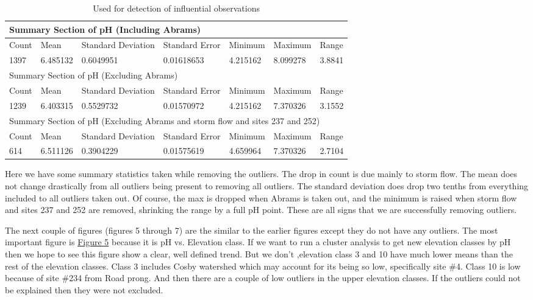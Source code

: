 \documentclass[11pt]{article} %
\begin{document}
\begin{table}[htbp]
\caption{Used for detection of influential observations}
\begin{tabular}{lllllll}
\toprule
\multicolumn{7}{l}{Summary Section of pH (Including Abrams)}  \\ 
\midrule
Count & Mean & Standard Deviation & Standard Error & Minimum & Maximum & Range \\ 
1397 & 6.485132 &0.6049951 & 0.01618653 &4.215162 & 8.099278 & 3.8841 \\ 
\midrule
\multicolumn{7}{l}{Summary Section of pH (Excluding Abrams)} \\ 
\midrule
Count & Mean & Standard Deviation & Standard Error & Minimum & Maximum & Range \\ 
1239 & 6.403315 & 0.5529732 & 0.01570972 & 4.215162 & 7.370326 & 3.1552 \\ 
\midrule
\multicolumn{7}{l}{Summary Section of pH (Excluding Abrams and storm flow and sites 237 and 252)}\\ 
\midrule
Count & Mean & Standard Deviation & Standard Error & Minimum & Maximum & Range \\ 
614 & 6.511126 & 0.3904229 & 0.01575619 & 4.659964 &7.370326 & 2.7104 \\ 
\bottomrule
\end{tabular}
\label{Data Summary}
\end{table}


Here we have some summary statistics taken while removing the outliers.  The drop in count is due mainly to storm flow.  The mean does not change drastically from all outliers being present to removing all outliers.  The standard deviation does drop two tenths from everything included to all outliers taken out.  Of course, the max is dropped when Abrams is taken out, and the minimum is raised when storm flow and sites 237 and 252 are removed, shrinking the range by a full pH point.  These are all signs that we are successfully removing outliers. 
    
The next couple of figures (figures 5 through 7) are the similar to the earlier figures except they do not have any outliers.  The most important figure is \hyperref[CAGraph8]{Figure 5} because it is pH vs. Elevation class.  If we want to run a cluster analysis to get new elevation classes by pH then we hope to see this figure show a clear, well defined trend.  But we don't ,elevation class 3 and 10 have much lower means than the rest of the elevation classes.  Class 3 includes Cosby watershed which may account for its being so low, specifically site $\#$4.  Class 10 is low because of site $\#$234 from Road prong.  And then there are a couple of low outliers in the upper elevation classes.  If the outliers could not be explained then they were not excluded.
\end{document}
